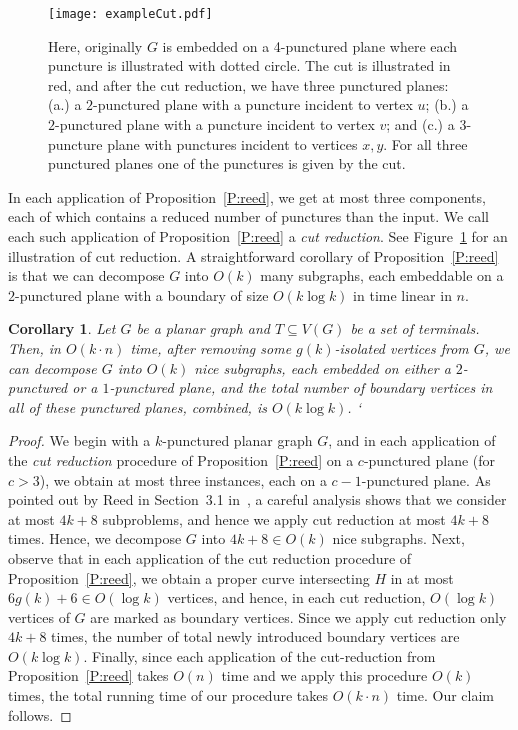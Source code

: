 \documentclass{article}
\newtheorem{corollary}[theorem]{Corollary}
\numberwithin{claimcounter}{lemma}
\begin{document}
\begin{figure}
    \centering
    \texttt{[image: exampleCut.pdf]}
    \caption{Here, originally $G$ is embedded on a 4-punctured plane where each puncture is illustrated with dotted circle. The cut is illustrated in red, and after the cut reduction, we have three punctured planes: (a.) a $2$-punctured plane with a puncture incident to vertex $u$; (b.) a $2$-punctured plane with a puncture incident to vertex $v$; and (c.) a $3$-puncture plane with punctures incident to vertices $x,y$. For all three punctured planes one of the  punctures is given by the cut.}
    \label{fig:exampleCut}
\end{figure}

In each application of Proposition~\ref{P:reed}, we get at most three components, each of which contains a reduced number of punctures than the input. We call each such application of Proposition~\ref{P:reed} a {\em cut reduction}.  See Figure~\ref{fig:exampleCut} for an illustration of cut reduction. A straightforward corollary of Proposition~\ref{P:reed} is that we can decompose $G$ into $O(k)$  many subgraphs, each embeddable on a $2$-punctured plane with a boundary of size  $O(k \log k)$ in time linear in $n$.
\begin{corollary}\label{C:1imp}
    Let $G$ be a planar graph and $T\subseteq V(G)$ be a set of terminals. Then, in $O(k\cdot n)$ time, after removing some $g(k)$-isolated vertices from $G$, we can decompose $G$ into $O (k)$ nice subgraphs, each embedded on either a $2$-punctured or a $1$-punctured plane, and the total number of boundary vertices in all of these punctured planes, combined, is $O(k \log k)$.
`\end{corollary}
\begin{proof}
     We begin with a $k$-punctured planar graph $G$, and in each application of the \textit{cut reduction} procedure of Proposition~\ref{P:reed} on a $c$-punctured plane (for $c>3$), we obtain at most three instances, each  on a $c-1$-punctured plane. As pointed out by Reed in Section~3.1 in~\cite{reedLinear}, a careful analysis shows that we consider at most $4k+8$ subproblems, and hence we apply cut reduction at most $4k+8$ times. Hence, we decompose $G$ into $4k+8 \in O(k)$ nice subgraphs. Next, observe that in each application of the cut reduction procedure of Proposition~\ref{P:reed}, we obtain a proper curve intersecting $H$ in at most $6g(k)+6 \in O(\log k)$ vertices, and hence, in each cut reduction,  $O(\log k)$  vertices of $G$ are marked as boundary vertices. Since we apply cut reduction only $4k+8$ times, the number of total newly introduced boundary vertices are $O(k \log k)$. Finally, since each application of the cut-reduction from Proposition~\ref{P:reed} takes $O(n)$ time and we apply this procedure  $O(k)$ times, the total running time of our procedure takes $O(k\cdot n)$ time.  Our claim follows.
\end{proof}
\end{document}
